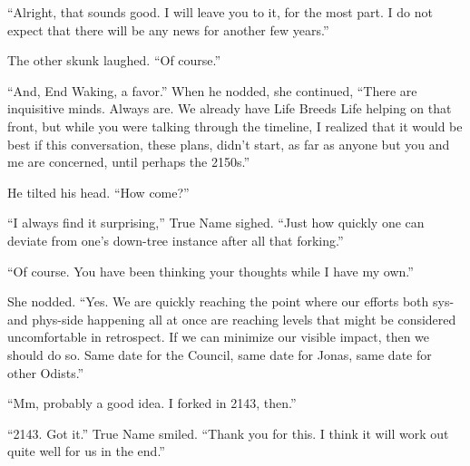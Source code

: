 ``Alright, that sounds good. I will leave you to it, for the most part. I do not expect that there will be any news for another few years.''

The other skunk laughed. ``Of course.''

``And, End Waking, a favor.'' When he nodded, she continued, ``There are inquisitive minds. Always are. We already have Life Breeds Life helping on that front, but while you were talking through the timeline, I realized that it would be best if this conversation, these plans, didn't start, as far as anyone but you and me are concerned, until perhaps the 2150s.''

He tilted his head. ``How come?''

``I always find it surprising,'' True Name sighed. ``Just how quickly one can deviate from one's down-tree instance after all that forking.''

``Of course. You have been thinking your thoughts while I have my own.''

She nodded. ``Yes. We are quickly reaching the point where our efforts both sys- and phys-side happening all at once are reaching levels that might be considered uncomfortable in retrospect. If we can minimize our visible impact, then we should do so. Same date for the Council, same date for Jonas, same date for other Odists.''

``Mm, probably a good idea. I forked in 2143, then.''

``2143. Got it.'' True Name smiled. ``Thank you for this. I think it will work out quite well for us in the end.''
